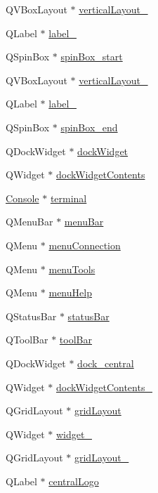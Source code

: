 \begin{DoxyCompactItemize}
Q\+V\+Box\+Layout $\ast$ \hyperlink{a00027_a38b8a4b887f3b58e2a49e7905ae6f1f0}{vertical\+Layout\+\_}
\item 
Q\+Label $\ast$ \hyperlink{a00027_a0376fd90247280e7c7957cc70628708c}{label\+\_}
\item 
Q\+Spin\+Box $\ast$ \hyperlink{a00027_acb4d6609c580645dac5aee1f1ad59d01}{spin\+Box\+\_\+start}
\item 
Q\+V\+Box\+Layout $\ast$ \hyperlink{a00027_a6f40fc110b15410c00837a446d57bdbe}{vertical\+Layout\+\_}
\item 
Q\+Label $\ast$ \hyperlink{a00027_a78c7e10730b43c6700cd7216911ed76a}{label\+\_}
\item 
Q\+Spin\+Box $\ast$ \hyperlink{a00027_a8ebeb5caa10878d7806d1f548913b449}{spin\+Box\+\_\+end}
\item 
Q\+Dock\+Widget $\ast$ \hyperlink{a00027_ac8a083c4b66fb317a9b538409ce412e2}{dock\+Widget}
\item 
Q\+Widget $\ast$ \hyperlink{a00027_a765ded8236736213d556f6f91941808e}{dock\+Widget\+Contents}
\item 
\hyperlink{a00002}{Console} $\ast$ \hyperlink{a00027_aae71c46ea4546df5994735dee573b2dd}{terminal}
\item 
Q\+Menu\+Bar $\ast$ \hyperlink{a00027_a2be1c24ec9adfca18e1dcc951931457f}{menu\+Bar}
\item 
Q\+Menu $\ast$ \hyperlink{a00027_a08372e1c0820afb98e2cdf98d1738036}{menu\+Connection}
\item 
Q\+Menu $\ast$ \hyperlink{a00027_a552c7b6d729252c2768c9a077679fef7}{menu\+Tools}
\item 
Q\+Menu $\ast$ \hyperlink{a00027_ab95dbfbb0550206aeac76db36f491548}{menu\+Help}
\item 
Q\+Status\+Bar $\ast$ \hyperlink{a00027_a50fa481337604bcc8bf68de18ab16ecd}{status\+Bar}
\item 
Q\+Tool\+Bar $\ast$ \hyperlink{a00027_ab84dc49349f514d7b7d3fe8e78de069b}{tool\+Bar}
\item 
Q\+Dock\+Widget $\ast$ \hyperlink{a00027_a19105d0d919fa33b5f29f7677bbab054}{dock\+\_\+central}
\item 
Q\+Widget $\ast$ \hyperlink{a00027_aee633ff4cf1f7b57d7490ac2abf023de}{dock\+Widget\+Contents\+\_}
\item 
Q\+Grid\+Layout $\ast$ \hyperlink{a00027_a525ed3c5fe0784ac502ee222fba4e205}{grid\+Layout}
\item 
Q\+Widget $\ast$ \hyperlink{a00027_a7e6140f8a0c9dd88512918a04bc46441}{widget\+\_}
\item 
Q\+Grid\+Layout $\ast$ \hyperlink{a00027_aa9ccdb529e4396a7c1d52c07add8e4ab}{grid\+Layout\+\_}
\item 
Q\+Label $\ast$ \hyperlink{a00027_ab5c037236f041a2a7753d3e4efd3d0e8}{central\+Logo}
\end{DoxyCompactItemize}


